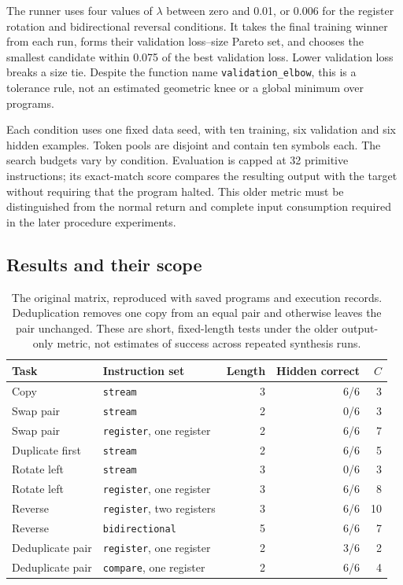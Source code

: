 \documentclass[11pt]{article}
\begin{document}
The runner uses four values of $\lambda$ between zero and 0.01, or 0.006 for
the register rotation and bidirectional reversal conditions. It takes the final
training winner from each run, forms their validation loss--size Pareto set,
and chooses the smallest candidate within 0.075 of the best validation loss.
Lower validation loss breaks a size tie. Despite the function name
\texttt{validation\_elbow}, this is a tolerance rule, not an estimated geometric
knee or a global minimum over programs.

Each condition uses one fixed data seed, with ten training, six validation and
six hidden examples. Token pools are disjoint and contain ten symbols each.
The search budgets vary by condition. Evaluation is capped at 32 primitive
instructions; its exact-match score compares the resulting output with the
target without requiring that the program halted. This older metric must be
distinguished from the normal return and complete input consumption required
in the later procedure experiments.

\subsection{Results and their scope}

\begin{table}[htbp]
\centering
\small
\begin{tabular}{llrrr}
\toprule
Task & Instruction set & Length & Hidden correct & $C$ \\
\midrule
Copy & \texttt{stream} & 3 & 6/6 & 3 \\
Swap pair & \texttt{stream} & 2 & 0/6 & 3 \\
Swap pair & \texttt{register}, one register & 2 & 6/6 & 7 \\
Duplicate first & \texttt{stream} & 2 & 6/6 & 5 \\
Rotate left & \texttt{stream} & 3 & 0/6 & 3 \\
Rotate left & \texttt{register}, one register & 3 & 6/6 & 8 \\
Reverse & \texttt{register}, two registers & 3 & 6/6 & 10 \\
Reverse & \texttt{bidirectional} & 5 & 6/6 & 7 \\
Deduplicate pair & \texttt{register}, one register & 2 & 3/6 & 2 \\
Deduplicate pair & \texttt{compare}, one register & 2 & 6/6 & 4 \\
\bottomrule
\end{tabular}
\caption{The original matrix, reproduced with saved programs and execution
records. Deduplication removes one copy from an equal pair and otherwise
leaves the pair unchanged. These are short, fixed-length tests under the older
output-only metric, not estimates of success across repeated synthesis runs.}
\label{tab:matrix}
\end{table}
\end{document}
